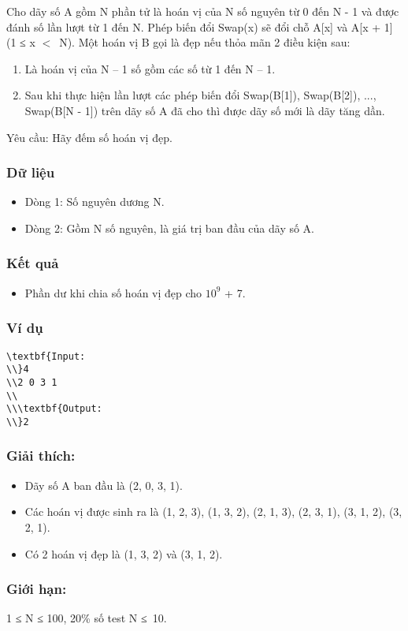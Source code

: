 



   Cho dãy số A gồm N phần tử là hoán vị của N số nguyên từ 0 đến N - 1 và được đánh số lần lượt từ 1 đến N. Phép biến đổi Swap(x) sẽ đổi chỗ A[x] và A[x + 1] (1 ≤ x $<$ N). Một hoán vị B gọi là đẹp nếu thỏa mãn 2 điều kiện sau:  
\begin{enumerate}
	\item     Là hoán vị của N – 1 số gồm các số từ 1 đến N – 1.   
	\item     Sau khi thực hiện lần lượt các phép biến đổi Swap(B[1]), Swap(B[2]), ..., Swap(B[N - 1]) trên dãy số A đã cho thì được dãy số mới là dãy tăng dần.   
\end{enumerate}

   Yêu cầu: Hãy đếm số hoán vị đẹp.  

\subsubsection{   Dữ liệu  }
\begin{itemize}
	\item     Dòng 1: Số nguyên dương N.   
	\item     Dòng 2: Gồm N số nguyên, là giá trị ban đầu của dãy số A.   
\end{itemize}

\subsubsection{   Kết quả  }
\begin{itemize}
	\item     Phần dư khi chia số hoán vị đẹp cho $10^{9}$    + 7.   
\end{itemize}

\subsubsection{   Ví dụ  }
\begin{verbatim}
\textbf{Input:
\\}4
\\2 0 3 1
\\
\\\textbf{Output:
\\}2\end{verbatim}

\subsubsection{   Giải thích:  }
\begin{itemize}
	\item     Dãy số A ban đầu là (2, 0, 3, 1).   
	\item     Các hoán vị được sinh ra là (1, 2, 3), (1, 3, 2), (2, 1, 3), (2, 3, 1), (3, 1, 2), (3, 2, 1).   
	\item     Có 2 hoán vị đẹp là (1, 3, 2) và (3, 1, 2).   
\end{itemize}

\subsubsection{\textbf{    Giới hạn:   }}

   1 ≤ N ≤ 100, 20\% số test N ≤ 10.  
